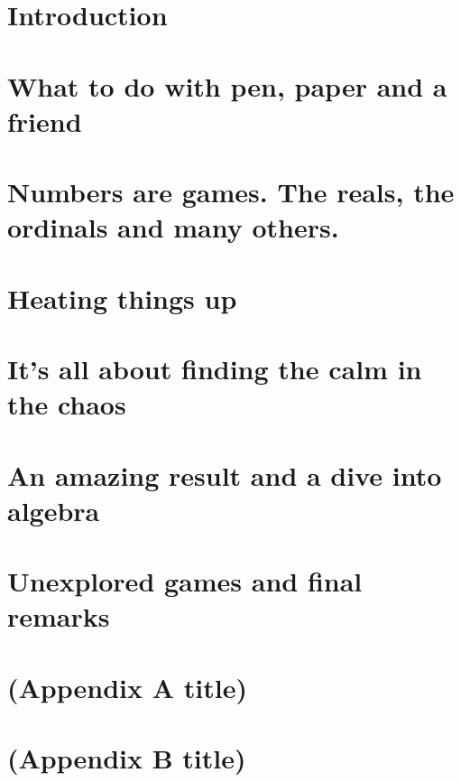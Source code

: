 \documentclass[12pt,twoside]{report}
\begin{document}
    

    

    {\hypersetup{linkcolor=black}
        \tableofcontents
        \listoffigures
        \listoftables
    }
        {\hypersetup{linkcolor=mycolor}}
    
    \chapter{Introduction} 
    
    
    \chapter{What to do with pen, paper and a friend}
    

    \chapter{Numbers are games. The reals, the ordinals and many others.}
    
    
    \chapter{Heating things up}
    
    
    \chapter{It's all about finding the calm in the chaos}
    
    
    \chapter{An amazing result and a dive into algebra}
    
    
    \chapter{Unexplored games and final remarks}
    
    
    
    \nocite{*}
    
    
    \appendix
    \chapter{(Appendix A title)}
    
    
     \chapter{(Appendix B title)}
    
\end{document}
